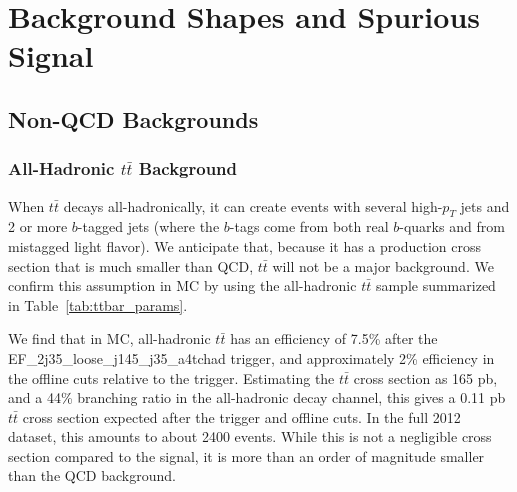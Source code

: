 


\section{Background Shapes and Spurious Signal}
\cite{spurious_signal}












\subsection{Non-QCD Backgrounds}
\label{sec:non_qcd_bkgs}

\subsubsection{All-Hadronic $t\bar{t}$ Background}
When $t\bar{t}$ decays all-hadronically, it can create events with several high-$p_T$
jets and 2 or more $b$-tagged jets (where the $b$-tags come from both real $b$-quarks
and from mistagged light flavor).  We anticipate that, because it has a production
cross section that is much smaller than QCD, $t\bar{t}$ will not be a major background.
We confirm this assumption in MC by using the all-hadronic $t\bar{t}$ sample summarized
in Table~\ref{tab:ttbar_params}.


We find that in MC, all-hadronic $t\bar{t}$ has an efficiency of 7.5\% after
the EF\_2j35\_loose\_j145\_j35\_a4tchad trigger, and approximately 2\% efficiency
in the offline cuts relative to the trigger.  Estimating the $t\bar{t}$ cross section
as 165 pb, and a 44\% branching ratio in the all-hadronic decay channel, this gives
a 0.11 pb $t\bar{t}$ cross section expected after the trigger and offline cuts.  In the
full 2012 dataset, this amounts to about 2400 events.  While
this is not a negligible cross section compared to the signal, it is more than an
order of magnitude smaller than the QCD background.

